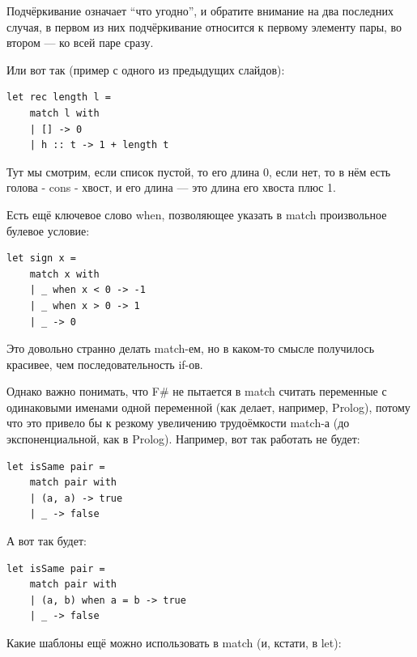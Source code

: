 \documentclass[a5paper]{article}
\begin{document}
Подчёркивание означает ``что угодно'', и обратите внимание на два последних случая, в первом из них подчёркивание относится к первому элементу пары, во втором --- ко всей паре сразу.

Или вот так (пример с одного из предыдущих слайдов):

\begin{verbatim}
let rec length l =
    match l with
    | [] -> 0
    | h :: t -> 1 + length t
\end{verbatim}

Тут мы смотрим, если список пустой, то его длина 0, если нет, то в нём есть голова - cons - хвост, и его длина --- это длина его хвоста плюс 1.

Есть ещё ключевое слово when, позволяющее указать в match произвольное булевое условие:

\begin{verbatim}
let sign x =
    match x with
    | _ when x < 0 -> -1
    | _ when x > 0 -> 1
    | _ -> 0
\end{verbatim}

Это довольно странно делать match-ем, но в каком-то смысле получилось красивее, чем последовательность if-ов.

Однако важно понимать, что F\# не пытается в match считать переменные с одинаковыми именами одной переменной (как делает, например, Prolog), потому что это привело бы к резкому увеличению трудоёмкости match-а (до экспоненциальной, как в Prolog). Например, вот так работать не будет:

\begin{verbatim}
let isSame pair =
    match pair with
    | (a, a) -> true
    | _ -> false
\end{verbatim}

А вот так будет:

\begin{verbatim}
let isSame pair =
    match pair with
    | (a, b) when a = b -> true
    | _ -> false
\end{verbatim}

Какие шаблоны ещё можно использовать в match (и, кстати, в let):
\end{document}
